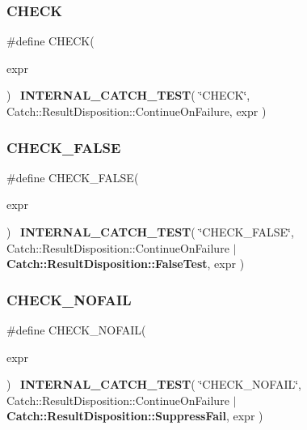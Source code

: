 \subsubsection{C\+H\+E\+CK}
{\footnotesize\ttfamily \#define C\+H\+E\+CK(\begin{DoxyParamCaption}\item[{}]{expr }\end{DoxyParamCaption})~\textbf{ I\+N\+T\+E\+R\+N\+A\+L\+\_\+\+C\+A\+T\+C\+H\+\_\+\+T\+E\+ST}( \char`\"{}C\+H\+E\+CK\char`\"{}, Catch\+::\+Result\+Disposition\+::\+Continue\+On\+Failure, expr )}

\mbox{\label{catch_8hpp_a8e6db07fea42f6472f431a940ff462bf}} 
\subsubsection{C\+H\+E\+C\+K\+\_\+\+F\+A\+L\+SE}
{\footnotesize\ttfamily \#define C\+H\+E\+C\+K\+\_\+\+F\+A\+L\+SE(\begin{DoxyParamCaption}\item[{}]{expr }\end{DoxyParamCaption})~\textbf{ I\+N\+T\+E\+R\+N\+A\+L\+\_\+\+C\+A\+T\+C\+H\+\_\+\+T\+E\+ST}( \char`\"{}C\+H\+E\+C\+K\+\_\+\+F\+A\+L\+SE\char`\"{}, Catch\+::\+Result\+Disposition\+::\+Continue\+On\+Failure $\vert$ \textbf{ Catch\+::\+Result\+Disposition\+::\+False\+Test}, expr )}

\mbox{\label{catch_8hpp_a50639cc19bf82ae5ce1c8d08d628784c}} 
\subsubsection{C\+H\+E\+C\+K\+\_\+\+N\+O\+F\+A\+IL}
{\footnotesize\ttfamily \#define C\+H\+E\+C\+K\+\_\+\+N\+O\+F\+A\+IL(\begin{DoxyParamCaption}\item[{}]{expr }\end{DoxyParamCaption})~\textbf{ I\+N\+T\+E\+R\+N\+A\+L\+\_\+\+C\+A\+T\+C\+H\+\_\+\+T\+E\+ST}( \char`\"{}C\+H\+E\+C\+K\+\_\+\+N\+O\+F\+A\+IL\char`\"{}, Catch\+::\+Result\+Disposition\+::\+Continue\+On\+Failure $\vert$ \textbf{ Catch\+::\+Result\+Disposition\+::\+Suppress\+Fail}, expr )}

